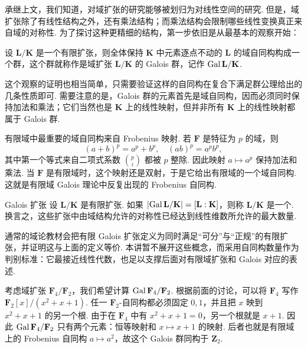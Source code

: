 承继上文，我们知道，对域扩张的研究能够被划归为对线性空间的研究. 但是，域扩张除了有线性结构之外，还有乘法结构；而乘法结构会限制哪些线性变换真正来自域的对称性. 为了探讨这种更精细的结构，第一步依旧是从最基本的观察开始：

\begin{theorem}{}{}
    设 $\mathbf{L}/\mathbf{K}$ 是一个有限扩张，则全体保持 $\mathbf{K}$ 中元素逐点不动的 $\mathbf{L}$ 的域自同构构成一个群，这个群就称作是域扩张 $\mathbf{L}/\mathbf{K}$ 的 Galois 群，记作 $\operatorname{Gal} \mathbf{L}/\mathbf{K}$.
\end{theorem}

这个观察的证明也相当简单，只需要验证这样的自同构在复合下满足群公理给出的几条性质即可. 需要注意的是，Galois 群的元素首先是域自同构，因而必须同时保持加法和乘法；它们当然也是 $\mathbf{K}$ 上的线性映射，但并非所有 $\mathbf{K}$ 上的线性映射都属于 Galois 群.

有限域中最重要的域自同构来自 Frobenius 映射. 若 $\mathbf{F}$ 是特征为 $p$ 的域，则
\[
    (a+b)^p=a^p+b^p,\quad (ab)^p=a^pb^p,
\]
其中第一个等式来自二项式系数 $\binom{p}{i}$ 都被 $p$ 整除. 因此映射 $a\mapsto a^p$ 保持加法和乘法. 当 $\mathbf{F}$ 是有限域时，这个映射还是双射，于是它给出有限域的一个域自同构. 这就是有限域 Galois 理论中反复出现的 Frobenius 自同构.

\begin{definition}{Galois 扩张}{}
    设 $\mathbf{L}/\mathbf{K}$ 是有限扩张. 如果 $\left|\operatorname{Gal}\mathbf{L}/\mathbf{K}\right|=[\mathbf{L}:\mathbf{K}]$，则称 $\mathbf{L}/\mathbf{K}$ 是一个. 换言之，这些扩张中由域结构允许的对称性已经达到线性维数所允许的最大数量.
\end{definition}

通常的域论教材会把有限 Galois 扩张定义为同时满足``可分''与``正规''的有限扩张，并证明这与上面的定义等价. 本讲暂不展开这些概念，而采用自同构数量作为判别标准：它最接近线性代数，也足以支撑后面对有限域扩张和 Galois 对应的表述.

\begin{example}{}{}
    考虑域扩张 $\mathbf{F}_4/\mathbf{F}_2$，我们希望计算 $\operatorname{Gal} \mathbf{F}_4/\mathbf{F}_2$. 根据前面的讨论，可以将 $\mathbf{F}_4$ 写作 $\mathbf{F}_2[x]/(x^2 + x + 1)$. 任一 $\mathbf{F}_2$-自同构都必须固定 $0,1$，并且把 $x$ 映到 $x^2 + x + 1$ 的另一个根. 由于在 $\mathbf{F}_4$ 中有 $x^2 + x + 1 = 0$，另一个根就是 $x + 1$. 因此 $\operatorname{Gal} \mathbf{F}_4/\mathbf{F}_2$ 只有两个元素：恒等映射和 $x\mapsto x + 1$ 的映射. 后者也就是有限域上的 Frobenius 自同构 $a\mapsto a^2$，故这个 Galois 群同构于 $\mathbf{Z}_2$.
\end{example}

